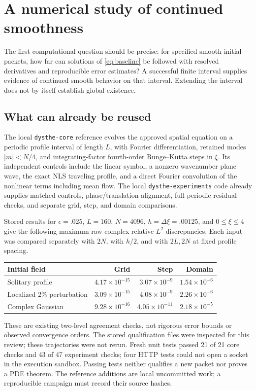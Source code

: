 \section{A numerical study of continued smoothness}
\label{sec:numerical-campaign}

The first computational question should be precise: for specified smooth
initial packets, how far can solutions of \eqref{eq:baseline} be followed with
resolved derivatives and reproducible error estimates?  A successful finite
interval supplies evidence of continued smooth behavior on that interval.
Extending the interval does not by itself establish global existence.

\subsection{What can already be reused}

The local \texttt{dysthe-core} reference evolves the approved spatial equation
on a periodic profile interval of length $L$, with Fourier differentiation,
retained modes $|m|<N/4$, and integrating-factor fourth-order Runge--Kutta
steps in $\xi$.  Its independent controls include the linear symbol, a nonzero
wavenumber plane wave, the exact NLS traveling profile, and a direct Fourier
convolution of the nonlinear terms including mean flow.  The local
\texttt{dysthe-experiments} code already supplies matched controls,
phase/translation alignment, full periodic residual checks, and separate
grid, step, and domain comparisons.

Stored results for $\epsilon=.025$, $L=160$, $N=4096$,
$h=\Delta\xi=.00125$, and $0\leq\xi\leq4$ give the following maximum raw
complex relative $L^2$ discrepancies.  Each input was compared separately
with $2N$, with $h/2$, and with $2L,2N$ at fixed profile spacing.
\begin{center}
\small
\begin{tabular}{lrrr}
\toprule
Initial field & Grid & Step & Domain\\
\midrule
Solitary profile & $4.17\times10^{-15}$ & $3.07\times10^{-9}$ & $1.54\times10^{-6}$\\
Localized $2\%$ perturbation & $3.09\times10^{-15}$ & $4.08\times10^{-9}$ & $2.26\times10^{-6}$\\
Complex Gaussian & $9.28\times10^{-16}$ & $4.05\times10^{-11}$ & $2.18\times10^{-5}$\\
\bottomrule
\end{tabular}
\end{center}
These are existing two-level agreement checks, not rigorous error bounds or
observed convergence orders.  The stored qualification files were inspected
for this review; these trajectories were not rerun.  Fresh unit tests passed
21 of 21 core checks and 43 of 47 experiment checks; four HTTP tests could not
open a socket in the execution sandbox.  Passing tests neither qualifies a
new packet nor proves a PDE theorem.  The reference additions are local
uncommitted work; a reproducible campaign must record their source hashes.

